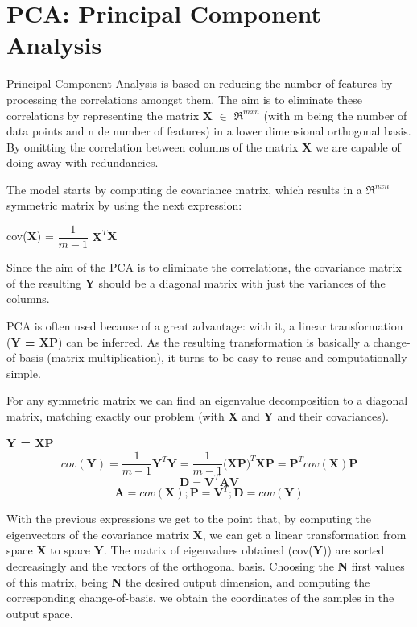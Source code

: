 \documentclass[a4paper,11pt,spanish]{report}
\begin{document}
\section{PCA: Principal Component Analysis}
\label{sec:pca}

Principal Component Analysis \citep{pca} is based on reducing the number of features by processing the correlations amongst them. The aim is to eliminate these correlations by representing the matrix \textbf{X} $\in$ $\Re^{mxn}$ (with m being the number of data points and n de number of features) in a lower dimensional orthogonal basis. By omitting the correlation between columns of the matrix \textbf{X} we are capable of doing away with redundancies.

The model starts by computing de covariance matrix, which results in a $\Re^{nxn}$ symmetric matrix by using the next expression:
\begin{center}
cov(\textbf{X}) = $\dfrac{1}{m-1}$ $\textbf{X}^{T}$\textbf{X}
\end{center}
Since the aim of the PCA is to eliminate the correlations, the covariance matrix of the resulting \textbf{Y} should be a diagonal matrix with just the variances of the columns.

PCA is often used because of a great advantage: with it, a linear transformation (\textbf{Y = XP}) can be inferred. As the resulting transformation is basically a change-of-basis (matrix multiplication), it turns to be easy to reuse and computationally simple.

For any symmetric matrix we can find an eigenvalue decomposition to a diagonal matrix, matching exactly our problem (with \textbf{X} and \textbf{Y} and their covariances).

\begin{center}
\textbf{Y = XP}
$$ cov(\textbf{Y}) = \frac{1}{m-1} \textbf{Y}^{T} \textbf{Y} = \frac{1}{m-1} \textbf{(XP)}^{T} \textbf{XP} = \textbf{P}^{T} cov(\textbf{X})\textbf{P} $$
$$\textbf{D} = \textbf{V}^{T} \textbf{AV}$$
$$ \textbf{A} = cov(\textbf{X}); \textbf{P} = \textbf{V}^{T}; \textbf{D} = cov(\textbf{Y})$$
\end{center}

With the previous expressions we get to the point that, by computing the eigenvectors of the covariance matrix \textbf{X}, we can get a linear transformation from space \textbf{X} to space \textbf{Y}. The matrix of eigenvalues obtained (cov(\textbf{Y})) are sorted decreasingly and the vectors of the orthogonal basis. Choosing the \textbf{N} first values of this matrix, being \textbf{N} the desired output dimension, and computing the corresponding change-of-basis, we obtain the coordinates of the samples in the output space.
\end{document}
